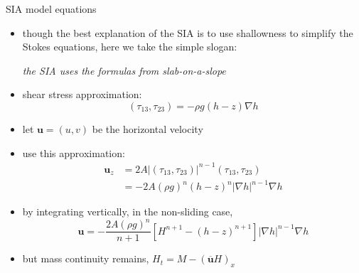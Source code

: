\begin{frame}{SIA model equations}

\begin{itemize}
\item \small though the best explanation of the SIA is to use shallowness to simplify the Stokes equations, here we take the simple slogan:\normalsize

\begin{center}
\emph{the SIA uses the formulas from slab-on-a-slope}
\end{center}
\item shear stress approximation:
	$$(\tau_{13},\tau_{23}) = - \rho g (h-z) \nabla h$$
\item let $\mathbf{u} = (u,v)$ be the horizontal velocity
\item use this approximation:
\begin{align*}
\mathbf{u}_z &= 2 A |(\tau_{13},\tau_{23})|^{n-1} (\tau_{13},\tau_{23}) \\
     &= - 2 A (\rho g)^n (h-z)^n |\nabla h|^{n-1} \nabla h
\end{align*}
\item by integrating vertically, in the non-sliding case,
    $$\mathbf{u} = - \frac{2 A (\rho g)^n}{n+1} \left[H^{n+1} - (h-z)^{n+1}\right] |\nabla h|^{n-1} \nabla h$$
\item but mass continuity remains, $H_t = M - \left(\overline{\mathbf{u}} H\right)_x$
\end{itemize}
\end{frame}


